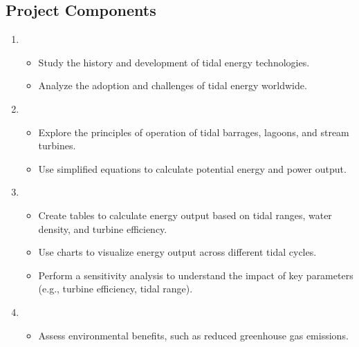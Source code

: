 \documentclass[letterpaper,10pt,english]{jupyterBook}
\begin{document}
\subsection{Project Components}
\label{\detokenize{ProjectInstructions:id32}}\begin{enumerate}
%
\item {} 
\sphinxAtStartPar
{}
\begin{itemize}
\item {} 
\sphinxAtStartPar
Study the history and development of tidal energy technologies.

\item {} 
\sphinxAtStartPar
Analyze the adoption and challenges of tidal energy worldwide.

\end{itemize}

\item {} 
\sphinxAtStartPar
{}
\begin{itemize}
\item {} 
\sphinxAtStartPar
Explore the principles of operation of tidal barrages, lagoons,
and stream turbines.

\item {} 
\sphinxAtStartPar
Use simplified equations to calculate potential energy and power
output.

\end{itemize}

\item {} 
\sphinxAtStartPar
{}
\begin{itemize}
\item {} 
\sphinxAtStartPar
Create tables to calculate energy output based on tidal ranges,
water density, and turbine efficiency.

\item {} 
\sphinxAtStartPar
Use charts to visualize energy output across different tidal
cycles.

\item {} 
\sphinxAtStartPar
Perform a sensitivity analysis to understand the impact of key
parameters (e.g., turbine efficiency, tidal range).

\end{itemize}

\item {} 
\sphinxAtStartPar
{}
\begin{itemize}
\item {} 
\sphinxAtStartPar
Assess environmental benefits, such as reduced greenhouse gas
emissions.


\end{itemize}
\end{enumerate}
\end{document}
